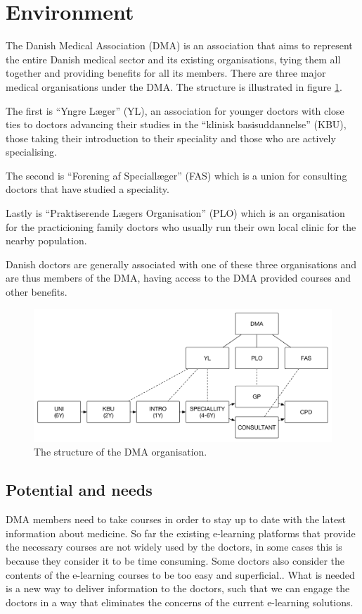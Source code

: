 \section{Environment}
The Danish Medical Association (DMA) is an association that aims to represent the entire Danish medical sector and its existing organisations, tying them all together and providing benefits for all its members. There are three major medical organisations under the DMA. The structure is illustrated in figure \ref{dmaorganisation}.

The first is “Yngre Læger” (YL), an association for younger doctors with close ties to doctors advancing their studies in the “klinisk basisuddannelse” (KBU), those taking their introduction to their speciality and those who are actively specialising.

The second is “Forening af Speciallæger” (FAS) which is a union for consulting doctors that have studied a speciality.

Lastly is “Praktiserende Lægers Organisation” (PLO) which is an organisation for the practicioning family doctors who usually run their own local clinic for the nearby population.

Danish doctors are generally associated with one of these three organisations and are thus members of the DMA, having access to the DMA provided courses and other benefits.

\begin{figure}[h!]
 \begin{center}
  \includegraphics[width=1\textwidth]{figures/dma-structure.pdf}
  \caption{The structure of the DMA organisation.\label{dmaorganisation}}
 \end{center}
\end{figure}

\subsection{Potential and needs}
DMA members need to take courses in order to stay up to date with the latest information about medicine. So far the existing e-learning platforms that provide the necessary courses are not widely used by the doctors, in some cases this is because they consider it to be time consuming. Some doctors also consider the contents of the e-learning courses to be too easy and superficial.. What is needed is a new way to deliver information to the doctors, such that we can engage the doctors in a way that eliminates the concerns of the current e-learning solutions.

